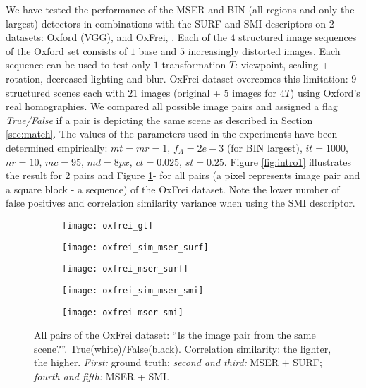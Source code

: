 \documentclass[a4paper,11pt]{article}
\begin{document}
We have tested the performance of the MSER and BIN (all regions and only the largest) detectors in combinations with the SURF and SMI descriptors on $2$ datasets: Oxford (VGG), \cite{Mikolajczyk:2005} and OxFrei, \cite{Ranguelova2016AICCSA}. Each of the $4$ structured image sequences of the Oxford set consists of $1$ base and $5$ increasingly distorted images. Each sequence can be used to test only $1$ transformation $T$: viewpoint, scaling + rotation, decreased lighting and blur. OxFrei dataset overcomes this limitation: $9$ structured scenes each with $21$ images (original + $5$ images for $4 T$) using Oxford's real homographies. We compared all possible image pairs and assigned a flag {\em True/False} if a pair is depicting the same scene as described in Section \ref{sec:match}. The values of the parameters used in the experiments have been determined empirically: $mt=mr=1$, $f_A=2e-3$ (for BIN largest), $it=1000$, $nr=10$, $mc=95$, $md=8px$, $ct=0.025$, $st=0.25$.
Figure \ref{fig:intro1} illustrates the result for 2 pairs and Figure \ref{fig:matching2}- for all pairs (a pixel represents image pair and a square block - a sequence) of the OxFrei dataset. Note the lower number of false positives and correlation similarity variance when using the SMI descriptor.

\begin{figure}[h]
 \vspace{-10pt} 
\begin{center}
\begin{subfigure}[b]{0.18\textwidth}
  \texttt{[image: oxfrei\_gt]}
\end{subfigure}
\begin{subfigure}[b]{0.18\textwidth}
\texttt{[image: oxfrei\_sim\_mser\_surf]}
\end{subfigure}
\begin{subfigure}[b]{0.18\textwidth}
  \texttt{[image: oxfrei\_mser\_surf]}
\end{subfigure}
\begin{subfigure}[b]{0.18\textwidth}
\texttt{[image: oxfrei\_sim\_mser\_smi]}
\end{subfigure}
\begin{subfigure}[b]{0.18\textwidth}
  \texttt{[image: oxfrei\_mser\_smi]}
\end{subfigure}
\end{center}
\vspace{-20pt}
\caption{\small  All pairs of the OxFrei dataset: ``Is the image pair from the same scene?''. True(white)/False(black).  Correlation similarity: the lighter, the higher. {\em First:} ground truth; {\em second and third:} MSER + SURF; {\em fourth and fifth:} MSER + SMI.}
\label{fig:matching2}
  \vspace{-12pt}
\end{figure}
\end{document}
